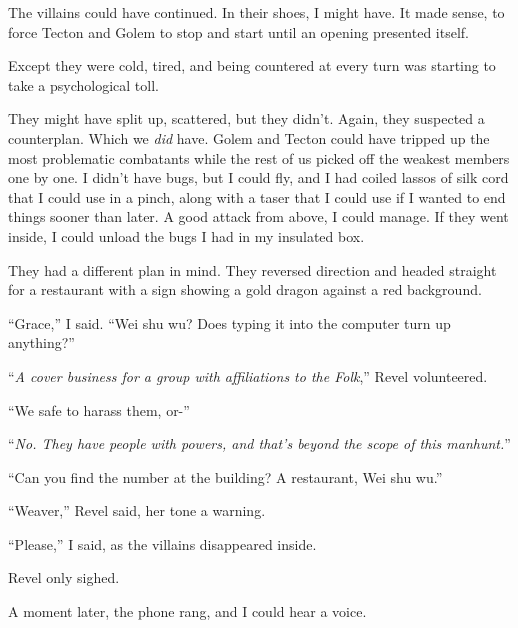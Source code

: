 The villains could have continued.  In their shoes, I might have.  It made sense, to force Tecton and Golem to stop and start until an opening presented itself.



Except they were cold, tired, and being countered at every turn was starting to take a psychological toll.



They might have split up, scattered, but they didn't.  Again, they suspected a counterplan.  Which we \emph{did} have.  Golem and Tecton could have tripped up the most problematic combatants while the rest of us picked off the weakest members one by one.  I didn't have bugs, but I could fly, and I had coiled lassos of silk cord that I could use in a pinch, along with a taser that I could use if I wanted to end things sooner than later.  A good attack from above, I could manage.  If they went inside, I could unload the bugs I had in my insulated box.



They had a different plan in mind.  They reversed direction and headed straight for a restaurant with a sign showing a gold dragon against a red background.



``Grace,'' I said.  ``Wei shu wu?  Does typing it into the computer turn up anything?''



``\emph{A cover business for a group with affiliations to the Folk},'' Revel volunteered.



``We safe to harass them, or-''



``\emph{No.  They have people with powers, and that's beyond the scope of this manhunt.}''



``Can you find the number at the building?  A restaurant, Wei shu wu.''



``Weaver,'' Revel said, her tone a warning.



``Please,'' I said, as the villains disappeared inside.



Revel only sighed.



A moment later, the phone rang, and I could hear a voice.




